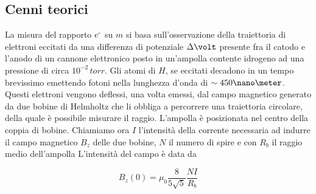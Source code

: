 \subsection{Cenni teorici}

La misura del rapporto $e^{\textrm{-}}$ su $m$ si basa sull'osservazione della traiettoria di elettroni eccitati da una differenza di potenziale $\Delta\volt$ presente fra il catodo e l'anodo di un cannone elettronico posto in un'ampolla contente idrogeno ad una pressione di circa $10^{-2}\,torr$.
Gli atomi di $H$, se eccitati decadono in un tempo brevissimo emettendo fotoni nella lunghezza d'onda di $\sim 450\nano\meter$.
Questi elettroni vengono deflessi, una volta emessi, dal campo magnetico generato da due bobine di Helmholtz che li obbliga a percorrere una traiettoria circolare, della quale è possibile misurare il raggio.
L'ampolla è posizionata nel centro della coppia di bobine.
Chiamiamo ora $I$ l'intensità della corrente necessaria ad indurre il campo magnetico $B_z$ delle due bobine, $N$ il numero di spire e con $R_b$ il raggio medio dell'ampolla
L'intensità del campo è data da 
\begin{center}
	\begin{equation*}
	B_z(0)=\mu_0\frac{8}{5\sqrt5}\frac{NI}{R_b}
	\end{equation*}
\end{center}


